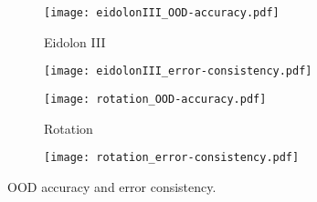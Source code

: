 \begin{figure}
	\begin{subfigure}{\figwidth}
		\centering
		\texttt{[image: eidolonIII\_OOD-accuracy.pdf]}
		\vspace{\captionspace}
		\caption{Eidolon III}
	\end{subfigure}\hfill
	\begin{subfigure}{\figwidth}
		\centering        \texttt{[image: eidolonIII\_error-consistency.pdf]}
		\vspace{\captionspace}
		\caption*{}
	\end{subfigure}\hfill
	\begin{subfigure}{\figwidth}
		\centering
		\texttt{[image: rotation\_OOD-accuracy.pdf]}
		\vspace{\captionspace}
		\caption{Rotation}
	\end{subfigure}\hfill
	\begin{subfigure}{\figwidth}
		\centering
		\texttt{[image: rotation\_error-consistency.pdf]}
		\vspace{\captionspace}
		\caption*{}
	\end{subfigure}\hfill
	\caption{OOD accuracy and error consistency.}
	\label{fig:results_accuracy_error_consistency}
\end{figure}